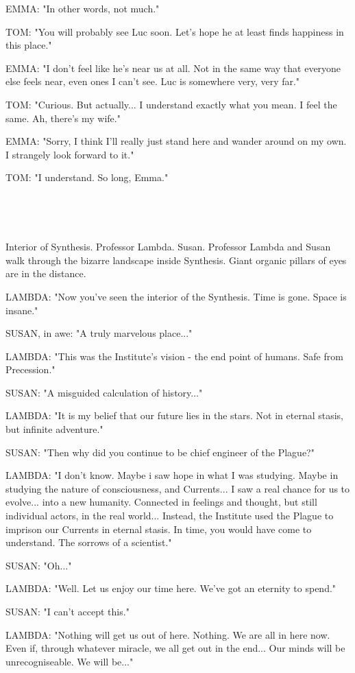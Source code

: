 \documentclass[11pt]{article}
\begin{document}
EMMA: "In other words, not much."

TOM: "You will probably see Luc soon.
Let's hope he at least finds happiness in this place."

EMMA: "I don't feel like he's near us at all.
Not in the same way that everyone else feels near, even ones I can't see.
Luc is somewhere very, very far."

TOM: "Curious. But actually... I understand exactly what you mean.
I feel the same.
Ah, there's my wife."

EMMA: "Sorry, I think I'll really just stand here and wander around on my own.
I strangely look forward to it."

TOM: "I understand. So long, Emma."

\ 

\ 

Interior of Synthesis.
Professor Lambda. Susan. 
Professor Lambda and Susan walk through the bizarre landscape inside Synthesis.
Giant organic pillars of eyes are in the distance.

LAMBDA: "Now you've seen the interior of the Synthesis.
Time is gone. Space is insane."

SUSAN, in awe: "A truly marvelous place..."

LAMBDA: "This was the Institute's vision - the end point of humans. 
Safe from Precession."

SUSAN: "A misguided calculation of history..."

LAMBDA: "It is my belief that our future lies in the stars. 
Not in eternal stasis, but infinite adventure."

SUSAN: "Then why did you continue to be chief engineer of the Plague?"

LAMBDA: "I don't know. 
Maybe i saw hope in what I was studying.
Maybe in studying the nature of consciousness, and Currents...
I saw a real chance for us to evolve...
into a new humanity.
Connected in feelings and thought, but still individual actors, in the real world...
Instead, the Institute used the Plague to imprison our Currents in eternal stasis.
In time, you would have come to understand.
The sorrows of a scientist."

SUSAN: "Oh..."

LAMBDA: "Well. 
Let us enjoy our time here. 
We've got an eternity to spend."

SUSAN: "I can't accept this."

LAMBDA: "Nothing will get us out of here. 
Nothing.
We are all in here now.
Even if, through whatever miracle, we all get out in the end...
Our minds will be unrecogniseable.
We will be..."
\end{document}
